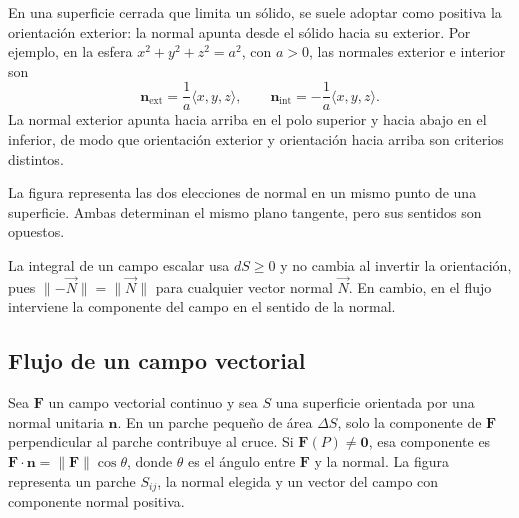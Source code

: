 En una superficie cerrada que limita un sólido, se suele adoptar como positiva la orientación exterior: la normal apunta desde el sólido hacia su exterior. Por ejemplo, en la esfera $x^2+y^2+z^2=a^2$, con $a>0$, las normales exterior e interior son
\[
\mathbf n_{\mathrm{ext}}=\frac1a\langle x,y,z\rangle,
\qquad
\mathbf n_{\mathrm{int}}=-\frac1a\langle x,y,z\rangle.
\]
La normal exterior apunta hacia arriba en el polo superior y hacia abajo en el inferior, de modo que orientación exterior y orientación hacia arriba son criterios distintos.

La figura representa las dos elecciones de normal en un mismo punto de una superficie. Ambas determinan el mismo plano tangente, pero sus sentidos son opuestos.

\begingroup\shorthandoff{>}
\begin{center}
\end{center}
\endgroup

La integral de un campo escalar usa $dS\geq0$ y no cambia al invertir la orientación, pues $\lVert-\vec N\rVert=\lVert\vec N\rVert$ para cualquier vector normal $\vec N$. En cambio, en el flujo interviene la componente del campo en el sentido de la normal.

\subsection{Flujo de un campo vectorial}

Sea $\mathbf F$ un campo vectorial continuo y sea $S$ una superficie orientada por una normal unitaria $\mathbf n$. En un parche pequeño de área $\Delta S$, solo la componente de $\mathbf F$ perpendicular al parche contribuye al cruce. Si $\mathbf F(P)\neq\mathbf0$, esa componente es $\mathbf F\cdot\mathbf n=\lVert\mathbf F\rVert\cos\theta$, donde $\theta$ es el ángulo entre $\mathbf F$ y la normal. La figura representa un parche $S_{ij}$, la normal elegida y un vector del campo con componente normal positiva.

